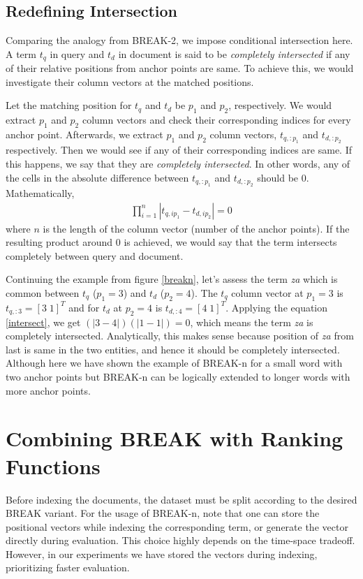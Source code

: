 \subsection{Redefining Intersection}
Comparing the analogy from BREAK-2, we impose conditional intersection here.
A term $t_q$ in query and $t_d$ in document is said to be \textit{completely intersected} if any of their relative positions from anchor points are same.
To achieve this, we would investigate their column vectors at the matched positions.

Let the matching position for $t_q$ and $t_d$ be $p_1$ and $p_2$, respectively.
We would extract $p_1$ and $p_2$ column vectors and check their corresponding indices for every anchor point.
Afterwards, we extract $p_1$ and $p_2$ column vectors, $t_{q, :p_1}$ and $t_{d, :p_2}$ respectively.
Then we would see if any of their corresponding indices are same.
If this happens, we say that they are \textit{completely intersected}.
In other words, any of the cells in the absolute difference between $t_{q, :p_1}$ and $t_{d, :p_2}$ should be 0.
Mathematically,
\begin{align}
	\label{intersect}
	\prod_{i = 1}^{n} |t_{q, ip_1} - t_{d, ip_2}| = 0
\end{align}
where $n$ is the length of the column vector (number of the anchor points).
If the resulting product around 0 is achieved, we would say that the term intersects completely between query and document.

Continuing the example from figure \ref{breakn}, let's assess the term \textit{za} which is common between $t_q$ ($p_1 = 3$) and $t_d$ ($p_2 = 4$). 
The $t_q$ column vector at $p_1 = 3$ is $t_{q, :3} = [3 \; 1]^T$ and for $t_d$ at $p_2 = 4$ is $t_{d, :4} = [4 \; 1]^T$.
Applying the equation \ref{intersect}, we get $\left(|3 - 4|\right) \left(|1 - 1|\right) = 0$, which means the term \textit{za} is completely intersected.
Analytically, this makes sense because position of \textit{za} from last is same in the two entities, and hence it should be completely intersected.
Although here we have shown the example of BREAK-n for a small word with two anchor points but BREAK-n can be logically extended to longer words with more anchor points.

\section{Combining BREAK with Ranking Functions}
Before indexing the documents, the dataset must be split according to the desired BREAK variant.
For the usage of BREAK-n, note that one can store the positional vectors while indexing the corresponding term, or generate the vector directly during evaluation.
This choice highly depends on the time-space tradeoff.
However, in our experiments we have stored the vectors during indexing, prioritizing faster evaluation. 

